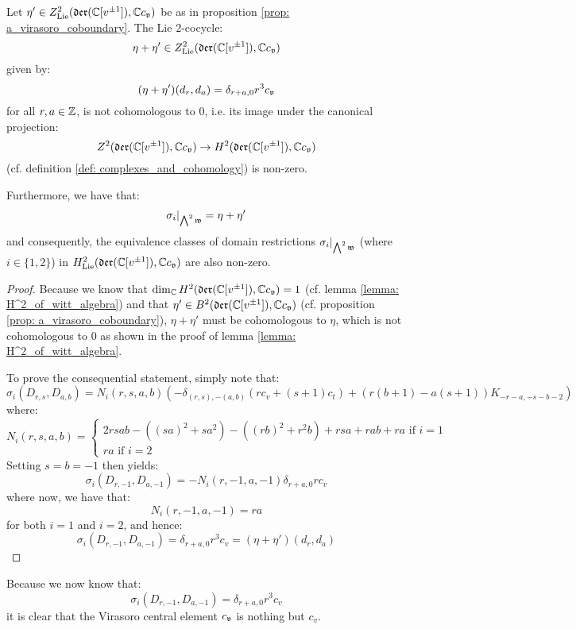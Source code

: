         \begin{proposition} \label{prop: non_zero_yangian_cocycles_on_witt_algebra}
            Let $\eta' \in Z^2_{\mathrm{Lie}}(\mathfrak{der}(\mathbb{C}[v^{\pm 1}]), \mathbb{C} c_{\mathfrak{v}})$ be as in proposition \ref{prop: a_virasoro_coboundary}. The Lie $2$-cocycle:
                $$\eta + \eta' \in Z^2_{\mathrm{Lie}}(\mathfrak{der}(\mathbb{C}[v^{\pm 1}]), \mathbb{C} c_{\mathfrak{v}})$$
            given by:
                $$(\eta + \eta')(d_r, d_a) = \delta_{r + a, 0} r^3 c_{\mathfrak{v}}$$
            for all $r, a \in \mathbb{Z}$, is not cohomologous to $0$, i.e. its image under the canonical projection:
                $$Z^2(\mathfrak{der}(\mathbb{C}[v^{\pm 1}]), \mathbb{C} c_{\mathfrak{v}}) \to H^2(\mathfrak{der}(\mathbb{C}[v^{\pm 1}]), \mathbb{C} c_{\mathfrak{v}})$$
            (cf. definition \ref{def: complexes_and_cohomology}) is non-zero.

            Furthermore, we have that:
                $$\sigma_i|_{\bigwedge^2 \mathfrak{w}} = \eta + \eta'$$
            and consequently, the equivalence classes of domain restrictions $\sigma_i|_{\bigwedge^2 \mathfrak{w}}$ (where $i \in \{1, 2\}$) in $H^2_{\mathrm{Lie}}( \mathfrak{der}(\mathbb{C}[v^{\pm 1}]), \mathbb{C} c_{\mathfrak{v}} )$ are also non-zero.
        \end{proposition}
            \begin{proof}
                Because we know that $\dim_{\mathbb{C}} H^2(\mathfrak{der}(\mathbb{C}[v^{\pm 1}]), \mathbb{C} c_{\mathfrak{v}}) = 1$ (cf. lemma \ref{lemma: H^2_of_witt_algebra}) and that $\eta' \in B^2(\mathfrak{der}(\mathbb{C}[v^{\pm 1}]), \mathbb{C} c_{\mathfrak{v}})$ (cf. proposition \ref{prop: a_virasoro_coboundary}), $\eta + \eta'$ must be cohomologous to $\eta$, which is not cohomologous to $0$ as shown in the proof of lemma \ref{lemma: H^2_of_witt_algebra}.

                To prove the consequential statement, simply note that:
                    $$\sigma_i(D_{r, s}, D_{a, b}) = N_i(r, s, a, b) \left( -\delta_{(r, s), -(a, b)} (r c_v + (s + 1) c_t) + ( r(b + 1) - a(s + 1) )K_{-r - a, -s - b - 2} \right)$$
                where:
                    $$
                        N_i(r, s, a, b) =
                        \begin{cases}
                            \text{$2 rsab - ( (sa)^2 + s a^2 ) - ( (rb)^2 + r^2 b ) + rsa + rab + ra$ if $i = 1$}
                            \\
                            \text{$ra$ if $i = 2$}
                        \end{cases}
                    $$
                Setting $s = b = -1$ then yields:
                    $$\sigma_i(D_{r, -1}, D_{a, -1}) = -N_i(r, -1, a, -1) \delta_{r + a, 0} r c_v$$
                where now, we have that:
                    $$N_i(r, -1, a, -1) = ra$$
                for both $i = 1$ and $i = 2$, and hence:
                    $$\sigma_i(D_{r, -1}, D_{a, -1}) = \delta_{r + a, 0} r^3 c_v = (\eta + \eta')(d_r, d_a)$$
            \end{proof}
        \begin{remark}
            Because we now know that:
                $$\sigma_i(D_{r, -1}, D_{a, -1}) = \delta_{r + a, 0} r^3 c_v$$
            it is clear that the Virasoro central element $c_{\mathfrak{v}}$ is nothing but $c_v$.
        \end{remark}

